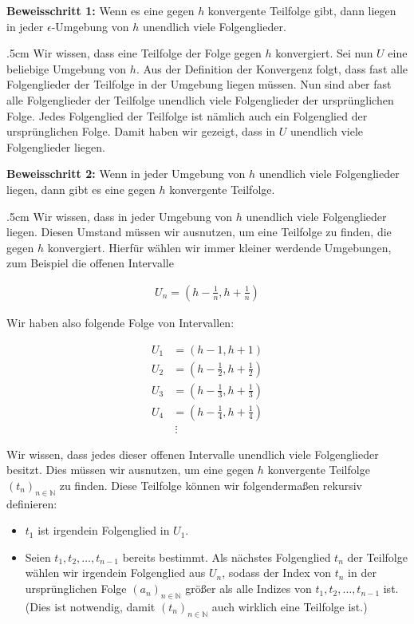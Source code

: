 \documentclass[fontsize=9pt,
               parskip=half-,
               DIV=14,
               listof=chapterentry,
               tocflat]{scrbook}
\newenvironment{indentblock}{\begin{adjustwidth}{.5cm}{}}{\end{adjustwidth}}
\newcommand{\proofstep}[1]{\textbf{\textcolor{sblau}{#1}}}
\begin{document}
\begin{proof*}
\proofstep{Beweisschritt 1:}
 Wenn es eine gegen $h$ konvergente Teilfolge gibt, dann liegen in jeder $\epsilon $-Umgebung von $h$ unendlich viele Folgenglieder.\begin{indentblock}
Wir wissen, dass eine Teilfolge der Folge gegen $h$ konvergiert. Sei nun $U$ eine beliebige Umgebung von $h$. Aus der Definition der Konvergenz folgt, dass fast alle Folgenglieder der Teilfolge in der Umgebung liegen müssen. Nun sind aber fast alle Folgenglieder der Teilfolge unendlich viele Folgenglieder der ursprünglichen Folge. Jedes Folgenglied der Teilfolge ist nämlich auch ein Folgenglied der ursprünglichen Folge. Damit haben wir gezeigt, dass in $U$ unendlich viele Folgenglieder liegen.

\end{indentblock}

\proofstep{Beweisschritt 2:}
 Wenn in jeder Umgebung von $h$ unendlich viele Folgenglieder liegen, dann gibt es eine gegen $h$ konvergente Teilfolge.\begin{indentblock}
Wir wissen, dass in jeder Umgebung von $h$ unendlich viele Folgenglieder liegen. Diesen Umstand müssen wir ausnutzen, um eine Teilfolge zu finden, die gegen $h$ konvergiert. Hierfür wählen wir immer kleiner werdende Umgebungen, zum Beispiel die offenen Intervalle

\begin{align*}
U_{n}=\left(h-{\tfrac {1}{n}},h+{\tfrac {1}{n}}\right)
\end{align*}

Wir haben also folgende Folge von Intervallen:

\begin{align*}
U_{1}&=\left(h-1,h+1\right)\\U_{2}&=\left(h-{\tfrac {1}{2}},h+{\tfrac {1}{2}}\right)\\U_{3}&=\left(h-{\tfrac {1}{3}},h+{\tfrac {1}{3}}\right)\\U_{4}&=\left(h-{\tfrac {1}{4}},h+{\tfrac {1}{4}}\right)\\&\ \vdots 
\end{align*}

Wir wissen, dass jedes dieser offenen Intervalle unendlich viele Folgenglieder besitzt. Dies müssen wir ausnutzen, um eine gegen $h$ konvergente Teilfolge $(t_{n})_{n\in \mathbb {N} }$ zu finden. Diese Teilfolge können wir folgendermaßen rekursiv definieren:

\begin{itemize}
\item $t_{1}$ ist irgendein Folgenglied in $U_{1}$.
\item Seien $t_{1},t_{2},\ldots ,t_{n-1}$ bereits bestimmt. Als nächstes Folgenglied $t_{n}$ der Teilfolge wählen wir irgendein Folgenglied aus $U_{n}$, sodass der Index von $t_{n}$ in der ursprünglichen Folge $(a_{n})_{n\in \mathbb {N} }$ größer als alle Indizes von $t_{1},t_{2},\ldots ,t_{n-1}$ ist. (Dies ist notwendig, damit $(t_{n})_{n\in \mathbb {N} }$ auch wirklich eine Teilfolge ist.)
\end{itemize}


\end{indentblock}
\end{proof*}
\end{document}
